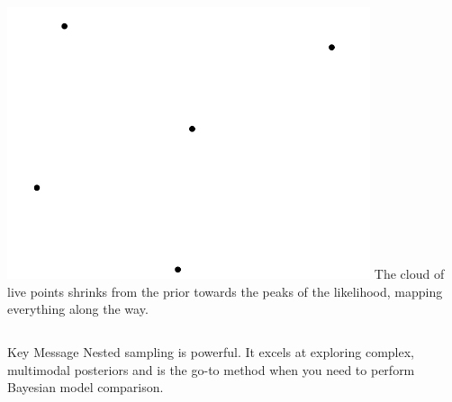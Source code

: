 \documentclass[aspectratio=169]{beamer}
\begin{document}
\begin{frame}
\begin{columns}[T]
        \begin{center}
            \includegraphics[width=0.8\textwidth]{figures/nested_sampling.pdf} %
            \small The cloud of live points shrinks from the prior towards the peaks of the likelihood, mapping everything along the way.
        \end{center}
    \end{columns}
    
    \begin{alertblock}{Key Message}
        Nested sampling is powerful. It excels at exploring complex, multimodal posteriors and is the go-to method when you need to perform Bayesian model comparison.
    \end{alertblock}
\end{frame}
\end{document}
